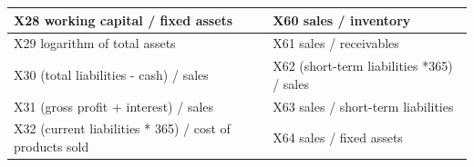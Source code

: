 \documentclass{article}
\begin{document}
\begin{center}
\begin{tabular}{| l | l |}
		X28 working capital / fixed assets                                                                                                                                 & X60 sales / inventory                                                                                                                        \\ \hline
		X29 logarithm of total assets                                                                                                                                      & X61 sales / receivables                                                                                                                      \\ \hline
		X30 (total liabilities - cash) / sales                                                                                                                             & X62 (short-term liabilities *365) / sales                                                                                                    \\ \hline
		X31 (gross profit + interest) / sales                                                                                                                              & X63 sales / short-term liabilities                                                                                                           \\ \hline
		X32 (current liabilities * 365) / cost of products sold                                                                                                            & X64 sales / fixed assets
		\\
		\hline                                                                                                    
	\end{tabular}
\end{center}
\end{document}
